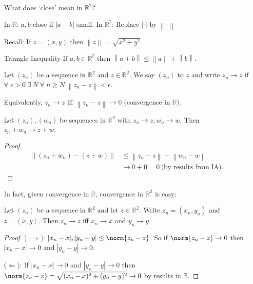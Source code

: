 What does `close' mean in $\mathbb{R}^2$?

In $\mathbb{R}$: $a, b$ close if $|a - b|$ small.
In $\mathbb{R}^2$: Replace $|\cdot|$ by $\left \lVert \cdot \right \rVert $

Recall: If $z = (x, y)$ then $\left \lVert z \right \rVert = \sqrt{x^2 + y^2}$.

Triangle Inequality If $a, b \in \mathbb{R}^2$ then $\left \lVert a + b \right \rVert \leq \left \lVert a \right \rVert + \left \lVert b \right \rVert$.

\begin{definition}
    Let $(z_n)$ be a sequence in $\mathbb{R}^2$ and $z \in \mathbb{R}^2$.
    We say $(z_n)$  to $z$ and write $z_n \to z$ if $\forall \; \epsilon > 0 \ \exists \; N \ \forall \; n \geq N \ \left \lVert z_n - z \right \rVert < \epsilon$. 

    Equivalently, $z_n \to z$ iff $\left \lVert z_n - z \right \rVert \to 0$ (convergence in $\mathbb{R}$).
\end{definition} 

\begin{example}
    Let $(z_n), (w_n)$ be sequences in $\mathbb{R}^2$ with $z_n \to z, w_n \to w$. 
    Then $z_n + w_n \to z + w$.
\end{example} 

\begin{proof}
    \begin{align*}
        \left \lVert (z_n + w_n) - (z + w) \right \rVert &\leq \left \lVert z_n - z \right \rVert + \left \lVert w_n - w \right \rVert \\
        &\to 0 + 0 = 0 \ \text{(by results from IA)}.
    \end{align*} 
\end{proof} 

In fact, given convergence in $\mathbb{R}$, convergence in $\mathbb{R}^2$ is easy:
\begin{proposition} \label{prop:one}
    Let $(z_n)$ be a sequence in $\mathbb{R}^2$ and let $z \in \mathbb{R}^2$.
    Write $z_n = (x_n, y_n)$ and $z = (x, y)$.
    Then $z_n \to z$ iff $x_n \to x$ and $y_n \to y$.
\end{proposition} 

\begin{proof}
    ($\implies$): $|x_n - x|, |y_n - y| \leq \norm{z_n - z}$.
    So if $\norm{z_n - z} \to 0$ then $|x_n - x| \to 0$ and $|y_n - y| \to 0$.

    ($\Longleftarrow$): If $|x_n - x| \to 0$ and $|y_n - y| \to 0$ then $\norm{z_n - z} = \sqrt{(x_n - x)^2 + (y_n - y)^2} \to 0$ by results in $\mathbb{R}$.
\end{proof} 

